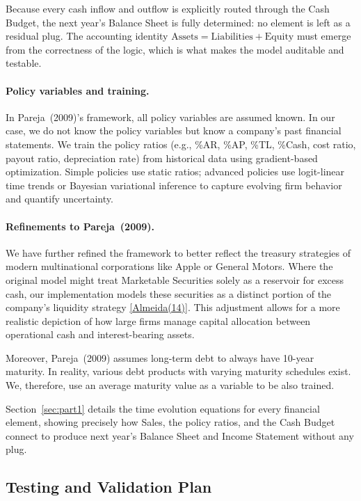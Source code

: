 \documentclass[12pt,a4paper]{article}
\begin{document}
Because every cash inflow and outflow is explicitly routed through the
Cash Budget, the next year's Balance Sheet is fully determined: no
element is left as a residual plug. The accounting identity
$\text{Assets} = \text{Liabilities} + \text{Equity}$ must emerge from
the correctness of the logic, which is what makes the model auditable
and testable.

\paragraph{Policy variables and training.}
In Pareja~(2009)'s framework, all policy variables are assumed known.
In our case, we do not know the policy variables but know a company's
past financial statements. We train the policy ratios (e.g., \%AR,
\%AP, \%TL, \%Cash, cost ratio, payout ratio, depreciation rate) from
historical data using gradient-based optimization. Simple policies use
static ratios; advanced policies use logit-linear time trends or
Bayesian variational inference to capture evolving firm behavior and
quantify uncertainty.

\paragraph{Refinements to Pareja~(2009).}
We have further refined the framework to better reflect the treasury
strategies of modern multinational corporations like Apple or General
Motors. Where the original model might treat Marketable Securities
solely as a reservoir for excess cash, our implementation models these
securities as a distinct portion of the company's liquidity strategy
\hyperlink{ref:almeida14}{[Almeida(14)]}. This adjustment allows for a more
realistic depiction of how large firms manage capital allocation between
operational cash and interest-bearing assets.

Moreover, Pareja~(2009) assumes long-term debt to always have 10-year
maturity. In reality, various debt products with varying maturity
schedules exist. We, therefore, use an average maturity value as a
variable to be also trained.

Section~\ref{sec:part1} details the time evolution equations for every
financial element, showing precisely how Sales, the policy ratios, and
the Cash Budget connect to produce next year's Balance Sheet and Income
Statement without any plug.

\subsection{Testing and Validation Plan}
\end{document}
